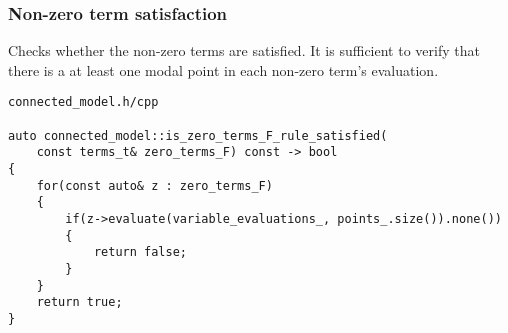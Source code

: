 \documentclass{article}
\begin{document}
	\newpage
	\subsubsection*{Non-zero term satisfaction}
	Checks whether the non-zero terms are satisfied. It is sufficient to verify that there is a at least one modal point in each non-zero term's evaluation.
\\
\begin{lstlisting}
connected_model.h/cpp

auto connected_model::is_zero_terms_F_rule_satisfied(
	const terms_t& zero_terms_F) const -> bool
{
    for(const auto& z : zero_terms_F)
    {
        if(z->evaluate(variable_evaluations_, points_.size()).none())
        {
            return false;
        }
    }
    return true;
}
\end{lstlisting}

	\newpage
\end{document}

